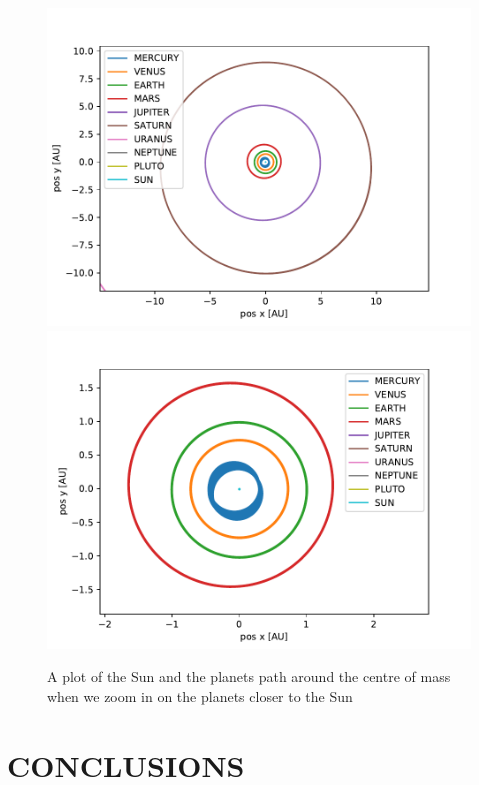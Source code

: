 \documentclass[a4paper]{article}
\begin{document}
\begin{figure}[h!]
	\centering 
	\includegraphics[scale=0.56]{../opp_f2.pdf}
	\includegraphics[scale=0.56]{../opp_f3.pdf}
	\caption{A plot of the Sun and the planets path around the centre of mass when we zoom in on the planets closer to the Sun}
	\label{f_1_1}
\end{figure}



\section{CONCLUSIONS}
\end{document}
